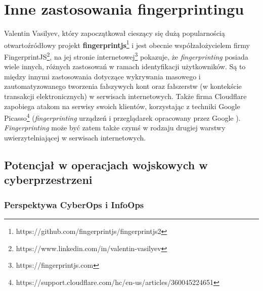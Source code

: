 \section{Inne zastosowania fingerprintingu}
Valentin Vasilyev, który zapoczątkował cieszący się dużą popularnością
otwartoźródłowy projekt
\textbf{fingerprintjs}\footnote{https://github.com/fingerprintjs/fingerprintjs2}
i jest obecnie współzałożycielem firmy
FingerprintJS\footnote{https://www.linkedin.com/in/valentin-vasilyev}, na jej
stronie internetowej\footnote{https://fingerprintjs.com} pokazuje, że
\emph{fingerprinting} posiada wiele innych, różnych zastosowań w ramach
identyfikacji użytkowników. Są to między innymi zastosowania dotyczące
wykrywania masowego i zautomatyzowanego tworzenia fałszywych kont oraz
fałszerstw (w kontekście transakcji elektronicznych) w serwisach internetowych.
Także firma Cloudflare zapobiega atakom na serwisy swoich klientów, korzystając
z techniki Google
Picasso\footnote{https://support.cloudflare.com/hc/en-us/articles/360045224651}
(\emph{fingerprinting} urządzeń i przeglądarek opracowany przez Google
\cite{45581}). \emph{Fingerprinting} może być zatem także czymś w rodzaju
drugiej warstwy uwierzytelniającej w serwisach internetowych.

\subsection{Potencjał w operacjach wojskowych w cyberprzestrzeni}

\subsubsection{Perspektywa CyberOps i InfoOps}
